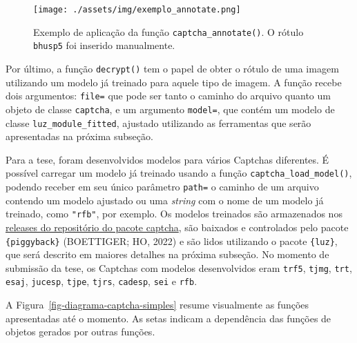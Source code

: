 \documentclass[12pt,twoside,brazilian]{book}
\begin{document}
\begin{figure}

{\centering \texttt{[image: ./assets/img/exemplo\_annotate.png]}

}

\caption{\label{fig-exemplo-annotate}Exemplo de aplicação da função
\texttt{captcha\_annotate()}. O rótulo \texttt{bhusp5} foi inserido
manualmente.}

\end{figure}

Por último, a função \texttt{decrypt()} tem o papel de obter o rótulo de
uma imagem utilizando um modelo já treinado para aquele tipo de imagem.
A função recebe dois argumentos: \texttt{file=} que pode ser tanto o
caminho do arquivo quanto um objeto de classe \texttt{captcha}, e um
argumento \texttt{model=}, que contém um modelo de classe
\texttt{luz\_module\_fitted}, ajustado utilizando as ferramentas que
serão apresentadas na próxima subseção.

Para a tese, foram desenvolvidos modelos para vários Captchas
diferentes. É possível carregar um modelo já treinado usando a função
\texttt{captcha\_load\_model()}, podendo receber em seu único parâmetro
\texttt{path=} o caminho de um arquivo contendo um modelo ajustado ou
uma \emph{string} com o nome de um modelo já treinado, como
\texttt{"rfb"}, por exemplo. Os modelos treinados são armazenados nos
\href{https://github.com/decryptr/captcha/releases}{releases do
repositório do pacote captcha}, são baixados e controlados pelo pacote
\texttt{\{piggyback\}} (BOETTIGER; HO, 2022) e são lidos utilizando o
pacote \texttt{\{luz\}}, que será descrito em maiores detalhes na
próxima subseção. No momento de submissão da tese, os Captchas com
modelos desenvolvidos eram \texttt{trf5}, \texttt{tjmg}, \texttt{trt},
\texttt{esaj}, \texttt{jucesp}, \texttt{tjpe}, \texttt{tjrs},
\texttt{cadesp}, \texttt{sei} e \texttt{rfb}.

A Figura~\ref{fig-diagrama-captcha-simples} resume visualmente as
funções apresentadas até o momento. As setas indicam a dependência das
funções de objetos gerados por outras funções.
\end{document}
